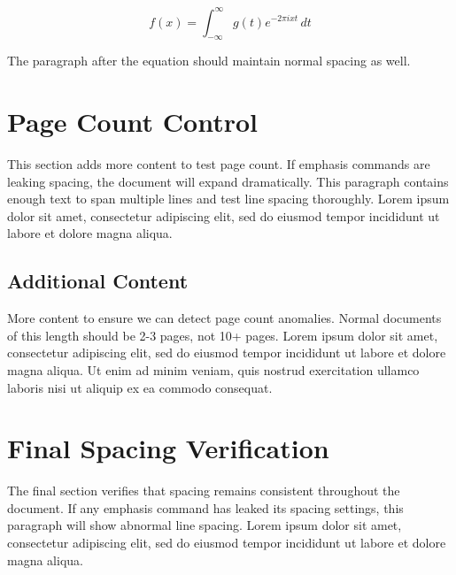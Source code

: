 \documentclass[11pt]{article}
\begin{document}
\begin{equation}
f(x) = \int_{-\infty}^{\infty} g(t) e^{-2\pi i x t} \, dt
\end{equation}

The paragraph after the equation should maintain normal spacing as well.

\section{Page Count Control}

This section adds more content to test page count. If emphasis commands are
leaking spacing, the document will expand dramatically. This paragraph contains
enough text to span multiple lines and test line spacing thoroughly. Lorem ipsum
dolor sit amet, consectetur adipiscing elit, sed do eiusmod tempor incididunt
ut labore et dolore magna aliqua.

\subsection{Additional Content}
More content to ensure we can detect page count anomalies. Normal documents of
this length should be 2-3 pages, not 10+ pages. Lorem ipsum dolor sit amet,
consectetur adipiscing elit, sed do eiusmod tempor incididunt ut labore et
dolore magna aliqua. Ut enim ad minim veniam, quis nostrud exercitation ullamco
laboris nisi ut aliquip ex ea commodo consequat.

\section{Final Spacing Verification}

The final section verifies that spacing remains consistent throughout the document.
If any emphasis command has leaked its spacing settings, this paragraph will show
abnormal line spacing. Lorem ipsum dolor sit amet, consectetur adipiscing elit,
sed do eiusmod tempor incididunt ut labore et dolore magna aliqua.
\end{document}
